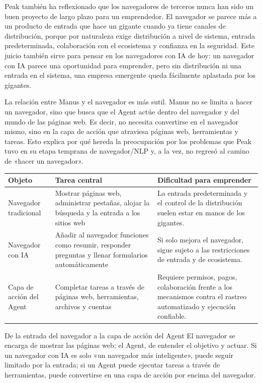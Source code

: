 \documentclass[a4paper]{article}
\begin{document}
Peak también ha reflexionado que los navegadores de terceros nunca han sido un buen proyecto de largo plazo para un emprendedor. El navegador se parece más a un producto de entrada que hace un gigante cuando ya tiene canales de distribución, porque por naturaleza exige distribución a nivel de sistema, entrada predeterminada, colaboración con el ecosistema y confianza en la seguridad. Este juicio también sirve para pensar en los navegadores con IA de hoy: un navegador con IA parece una oportunidad para emprender, pero sin distribución ni una entrada en el sistema, una empresa emergente queda fácilmente aplastada por los gigantes.

La relación entre Manus y el navegador es más sutil. Manus no se limita a hacer un navegador, sino que busca que el Agent actúe dentro del navegador y del mundo de las páginas web. Es decir, no necesita convertirse en el navegador mismo, sino en la capa de acción que atraviesa páginas web, herramientas y tareas. Esto explica por qué hereda la preocupación por los problemas que Peak tuvo en su etapa temprana de navegador/NLP y, a la vez, no regresó al camino de «hacer un navegador».

\begin{longtable}{p{}p{}p{}}
\toprule
Objeto & Tarea central & Dificultad para emprender \\
\midrule
Navegador tradicional & Mostrar páginas web, administrar pestañas, alojar la búsqueda y la entrada a los sitios web & La entrada predeterminada y el control de la distribución suelen estar en manos de los gigantes. \\
Navegador con IA & Añadir al navegador funciones como resumir, responder preguntas y llenar formularios automáticamente & Si solo mejora el navegador, sigue sujeto a las restricciones de entrada y de ecosistema. \\
Capa de acción del Agent & Completar tareas a través de páginas web, herramientas, archivos y cuentas & Requiere permisos, pagos, colaboración frente a los mecanismos contra el rastreo automatizado y ejecución confiable. \\
\bottomrule
\end{longtable}

\begin{importantbox}{De la entrada del navegador a la capa de acción del Agent}
El navegador se encarga de mostrar las páginas web; el Agent, de entender el objetivo y actuar. Si un navegador con IA es solo «un navegador más inteligente», puede seguir limitado por la entrada; si un Agent puede ejecutar tareas a través de herramientas, puede convertirse en una capa de acción por encima del navegador.
\end{importantbox}
\end{document}
